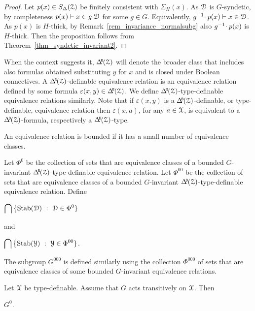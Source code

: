 \begin{proof}
  Let $p(x)\in S_\Delta(\EuScript Z)$ be finitely consistent with $\Sigma_H(x)$.
  As $\EuScript D$ is $G$-syndetic, by completeness $p(x)\vdash x\in g{\cdot}\EuScript D$ for some $g\in G$.
  Equivalently, $g^{-1}\kern-.5ex\cdot p(x)\vdash x\in\EuScript D$.
  As $p(x)$ is $H$-thick, by Remark~\ref{rem_invariance_normalsubg} also $g^{-1}\kern-.5ex\cdot p(x)$ is $H$-thick.
  Then the proposition follows from Theorem~\ref{thm_syndetic_invariant2}.
\end{proof}

When the context suggests it, $\BDelta(\Z)$ will denote the broader class that includes also formulas obtained substituting $y$ for $x$ and is closed under Boolean connectives.
A $\BDelta(\Z)$-definable equivalence relation is an equivalence relation defined by some formula $\varepsilon(x,y)\in\BDelta(\Z)$.
We define $\BDelta(\Z)$-type-definable equivalence relations similarly.
Note that if $\varepsilon(x,y)$ is a $\BDelta(\Z)$-definable, or type-definable, equivalence relation then $\varepsilon(x,a)$, for any $a\in\EuScript X$, is equivalent to a $\BDelta(\Z)$-formula, respectively a $\BDelta(\Z)$-type.

An equivalence relation is bounded if it has a small number of equivalence classes.

\begin{definition}\label{def_G00}
  Let $\Phi^0$ be the collection of sets that are equivalence classes of a bounded $G$-invariant $\BDelta(\Z)$-type-definable equivalence relation.
  Let $\Phi^{00}$ be the collection of sets that are equivalence classes of a bounded $G$-invariant $\BDelta(\Z)$-type-definable equivalence relation.
  Define
  \smallskip

  \medrel{=}$\displaystyle\bigcap\big\{{\rm Stab}(\D)\ :\  \D\in\Phi^0\}$

  and

  \medrel{=}$\displaystyle\bigcap\big\{{\rm Stab}(\Y)\ :\  \Y\in\Phi^{00}\}$.\medskip

  The subgroup \emph{$G^{000}$} is defined similarly using the collection $\Phi^{000}$ of sets that are equivalence classes of some bounded $G$-invariant equivalence relations.
\end{definition}

\begin{proposition}
  Let $\EuScript X$ be type-definable.
  Assume that $G$ acts transitively on $\EuScript X$.
  Then 
  
  \medrel{\leq}$G^0$.
\end{proposition}

